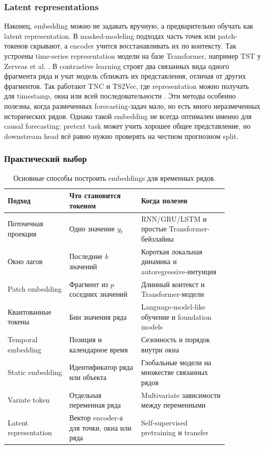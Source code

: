 \documentclass[12pt,fleqn]{article}
\begin{document}
\subsubsection{Latent representations}

Наконец, embedding можно не задавать вручную, а предварительно обучать как latent representation.
В masked-modeling подходах часть точек или patch-токенов скрывают, а encoder учится восстанавливать их по контексту.
Так устроены time-series representation модели на базе Transformer, например TST у Zerveas et al. \cite{zerveas2021}.
В contrastive learning строят два связанных вида одного фрагмента ряда и учат модель сближать их представления, отличая от других фрагментов.
Так работают TNC и TS2Vec, где representation можно получать для timestamp, окна или всей последовательности \cite{tonekaboni2021,yue2022ts2vec}.
Эти методы особенно полезны, когда размеченных forecasting-задач мало, но есть много неразмеченных исторических рядов.
Однако такой embedding не всегда оптимален именно для causal forecasting: pretext task может учить хорошее общее представление, но downstream head всё равно нужно проверять на честном прогнозном split.

\subsubsection{Практический выбор}

\begin{table}[!ht]
\centering
\begin{tabular}{p{0.24\linewidth}p{0.28\linewidth}p{0.34\linewidth}}
\hline
Подход & Что становится токеном & Когда полезен \\
\hline
Поточечная проекция & Одно значение $y_t$ & RNN/GRU/LSTM и простые Transformer-бейзлайны \\
Окно лагов & Последние $k$ значений & Короткая локальная динамика и autoregressive-интуиция \\
Patch embedding & Фрагмент из $p$ соседних значений & Длинный контекст и Transformer-модели \\
Квантованные токены & Бин значения ряда & Language-model-like обучение и foundation models \\
Temporal embedding & Позиция и календарное время & Сезонность и порядок внутри окна \\
Static embedding & Идентификатор ряда или объекта & Глобальные модели на множестве связанных рядов \\
Variate token & Отдельная переменная ряда & Multivariate зависимости между переменными \\
Latent representation & Вектор encoder-а для точки, окна или ряда & Self-supervised pretraining и transfer \\
\hline
\end{tabular}
\caption{Основные способы построить embeddings для временных рядов.}
\end{table}
\end{document}
